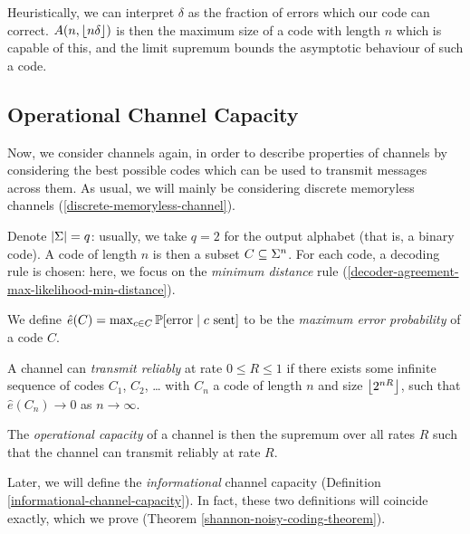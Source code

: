 \documentclass{article}
\begin{document}
Heuristically, we can interpret $\delta$
as the fraction of errors which our code can correct.
$A(n, \floor{n\delta})$ is then the maximum size of a code with length $n$
which is capable of this,
and the limit supremum bounds the asymptotic behaviour of such a code.


\subsection{Operational Channel Capacity}
\label{section-error-control-operational-capacity}

Now, we consider channels again,
in order to describe properties of channels
by considering the best possible codes
which can be used to transmit messages across them.
As usual, we will mainly be considering
discrete memoryless channels (\ref{discrete-memoryless-channel}).

Denote $\abs \Sigma = q$:
usually, we take $q = 2$ for the output alphabet (that is, a binary code).
A code of length $n$ is then a subset $C \subs \Sigma^n$.
For each code, a decoding rule is chosen:
here, we focus on the \textit{minimum distance} rule
(\ref{decoder-agreement-max-likelihood-min-distance}).

\begin{definition}
	\label{operational-channel-capacity}
    We define $\hat e(C) = \max_{c \in C} \P[\text{error} \mid c \text{ sent}]$
    to be the \textit{maximum error probability} of a code $C$.
    
    A channel can \textit{transmit reliably} at rate $0 \leq R \leq 1$
    if there exists some infinite sequence of codes $C_1$, $C_2$, \dots
    with $C_n$ a code of length $n$ and size $\floor{2^{nR}}$,
    such that $\hat e(C_n) \to 0$ as $n \to \infty$.
    
    The \textit{operational capacity} of a channel
    is then the supremum over all rates $R$
    such that the channel can transmit reliably at rate $R$.
\end{definition}

\begin{note}
	Later, we will define the \textit{informational} channel capacity
	(Definition \ref{informational-channel-capacity}).
	In fact, these two definitions will coincide exactly,
	which we prove (Theorem \ref{shannon-noisy-coding-theorem}).
\end{note}
\end{document}
